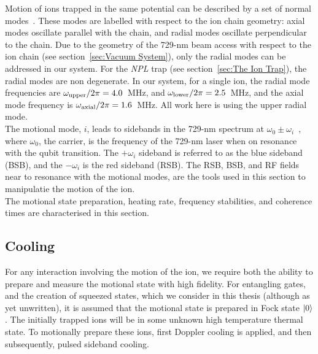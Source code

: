     Motion of ions trapped in the same potential can be described by a set of normal modes~\cite{james1998quantum}. These modes are labelled with respect to the ion chain geometry: axial modes oscillate parallel with the chain, and radial modes oscillate perpendicular to the chain. Due to the geometry of the 729-nm beam access with respect to the ion chain (see section~\ref{sec:Vacuum System}), only the radial modes can be addressed in our system. For the \emph{NPL} trap (see section~\ref{sec:The Ion Trap}), the radial modes are non degenerate. In our system, for a single ion, the radial mode frequencies are $\omega_{\rm upper}/2\pi = 4.0$~\unit{\MHz}, and $\omega_{\rm lower}/2\pi = 2.5$~\unit{\MHz}, and the axial mode frequency is $\omega_{\rm axial}/2\pi = 1.6$~\unit{\MHz}. All work here is using the upper radial mode. \\
    The motional mode, $i$, leads to sidebands in the 729-nm spectrum at $\omega_0 \pm \omega_{i}$~\cite{ozeri2011tutorial}, where $\omega_0$, the carrier, is the frequency of the 729-nm laser when on resonance with the qubit transition. The $+\omega_i$ sideband is referred to as the blue sideband (BSB), and the $-\omega_i$ is the red sideband (RSB).
    The RSB, BSB, and RF fields near to resonance with the motional modes, are the tools used in this section to manipulatie the motion of the ion.\\
    The motional state preparation, heating rate, frequency stabilities, and coherence times are characterised in this section.

\subsection{Cooling}
\label{sec:Cooling}

    For any interaction involving the motion of the ion, we require both the
    ability to prepare and measure the motional state with high fidelity. For
    entangling gates, and the creation of squeezed states, which we 
    consider in this thesis (although as yet unwritten), it is assumed that the motional state is prepared in Fock state $\ket{0}$. The initially trapped ions will
    be in some unknown high temperature thermal state. To motionally prepare these ions, first Doppler cooling is applied, and then
    subsequently, pulsed sideband cooling. \\

